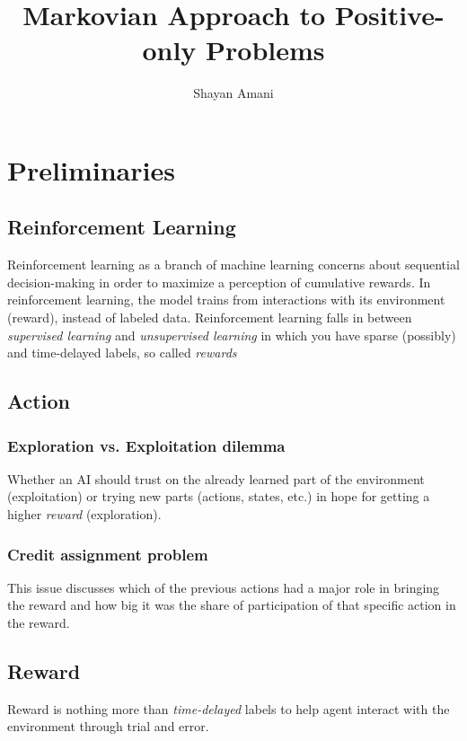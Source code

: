 \documentclass[a4paper,12pt]{article}
\title{Markovian Approach to Positive-only Problems}
\author{Shayan Amani}
\begin{document}
\maketitle


\section{Preliminaries}

\subsection{Reinforcement Learning}
Reinforcement learning as a branch of machine learning concerns about sequential decision-making in order to maximize a perception of cumulative rewards. In reinforcement learning, the model trains from interactions with its environment (reward), instead of labeled data. Reinforcement learning falls in between \textit{supervised learning} and \textit{unsupervised learning} in which you have sparse (possibly) and time-delayed labels, so called \textit{rewards} 

\subsection{Action}

\subsubsection{Exploration vs. Exploitation dilemma}
Whether an AI should trust on the already learned part of the environment (exploitation) or trying new parts (actions, states, etc.) in hope for getting a higher \textit{reward} (exploration). 

\subsubsection{Credit assignment problem}
This issue discusses which of the previous actions had a major role in bringing the reward and how big it was the share of participation of that specific action in the reward.

\subsection{Reward}
Reward is nothing more than \textit{time-delayed} labels to help agent interact with the environment through trial and error. 
\end{document}
